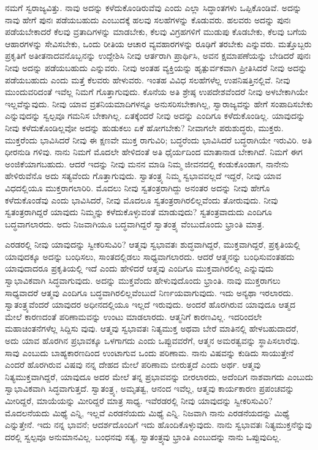 ನಮಗೆ ಸ್ವರಾಜ್ಯವಿತ್ತು. ನಾವು ಅದನ್ನು ಕಳೆದುಕೊಂಡಿರುವೆವು ಎಂದು ಎಲ್ಲಾ ಸಿದ್ಧಾಂತಗಳು ಒಪ್ಪಿಕೊಂಡಿವೆ. ಅದನ್ನು ನಾವು ಹೇಗೆ ಪುನಃ ಪಡೆಯಬಹುದು ಎಂಬುದಕ್ಕೆ ಹಲವು ಸಲಹೆಗಳನ್ನು ಕೊಡುವರು. ಹಲವರು ಅದನ್ನು ಪುನಃ ಪಡೆಯಬೇಕಾದರೆ ಕೆಲವು ವ್ರತಾದಿಗಳನ್ನು ಮಾಡಬೇಕು, ಕೆಲವು ವಿಗ್ರಹಗಳಿಗೆ ಮುಡುಪು ಕೊಡಬೇಕು, ಕೆಲವು ಬಗೆಯ ಆಹಾರಗಳನ್ನು ಸೇವಿಸಬೇಕು, ಒಂದು ರೀತಿಯ ಆಚಾರ ವ್ಯವಹಾರಗಳನ್ನು ರೂಢಿಗೆ ತರಬೇಕು ಎನ್ನುವರು. ಮತ್ತೊಬ್ಬರು ಪ್ರಕೃತಿಗೆ ಅತೀತನಾದವನೊಬ್ಬನನ್ನು ಉದ್ದೇಶಿಸಿ ನೀವು ಆರ್ತರಾಗಿ ಪ್ರಾರ್ಥಿಸಿ, ಅವನ ಕ್ಷಮಾಪಣೆಯನ್ನು ಬೇಡಿದರೆ ಪುನಃ ನೀವು ಅದನ್ನು ಪಡೆಯಬಹುದು ಎನ್ನುವರು. ನೀವು ಅಂತಹ ವ್ಯಕ್ತಿಯನ್ನು ಹೃತ್ಪುರ್ವಕವಾಗಿ ಪ್ರೀತಿಸಿದರೆ ನೀವು ಅದನ್ನು ಪಡೆಯಬಹುದು ಎಂದು ಮತ್ತೆ ಕೆಲವರು ಹೇಳುವರು. ಇಂತಹ ವಿವಿಧ ಸಲಹೆಗಳೆಲ್ಲ ಉಪನಿಷತ್ತಿನಲ್ಲಿವೆ. ನೀವು ಮುಂದುವರಿದಂತೆ ಇವೆಲ್ಲ ನಿಮಗೆ ಗೊತ್ತಾಗುವುದು. ಕೊನೆಯ ಅತಿ ಶ್ರೇಷ್ಠ ಉಪದೇಶವೆಂದರೆ ನೀವು ಅಳಬೇಕಾಗಿಯೇ ಇಲ್ಲವೆನ್ನುವುದು. ನೀವು ಯಾವ ವ್ರತನಿಯಮಾದಿಗಳನ್ನೂ ಅನುಸರಿಸಬೇಕಾಗಿಲ್ಲ, ಸ್ವಾರಾಜ್ಯವನ್ನು ಹೇಗೆ ಸಂಪಾದಿಸಬೇಕು ಎನ್ನುವುದನ್ನು ಸ್ವಲ್ಪವೂ ಗಮನಿಸ ಬೇಕಾಗಿಲ್ಲ. ಏತಕ್ಕೆಂದರೆ ನೀವು ಅದನ್ನು ಎಂದಿಗೂ ಕಳೆದುಕೊಂಡಿಲ್ಲ. ಯಾವುದನ್ನು ನೀವು ಕಳೆದುಕೊಂಡಿಲ್ಲವೋ ಅದನ್ನು ಹುಡುಕಲು ಏಕೆ ಹೋಗಬೇಕು? ನೀವಾಗಲೇ ಪರುಶುದ್ಧರು, ಮುಕ್ತರು. ಮುಕ್ತರೆಂದು ಭಾವಿಸಿದರೆ ನೀವು ಈ ಕ್ಷಣವೇ ಮುಕ್ತ ರಾಗುವಿರಿ; ಬದ್ಧರೆಂದು ಭಾವಿಸಿದರೆ ಬದ್ಧರಾಗಿಯೇ ಇರುವಿರಿ. ಅತಿ ಧೀರನುಡಿ ಗಳಿವು. ನಾನು ನಿಮಗೆ ಮೊದಲೇ ಹೇಳಿದಂತೆ ಅತಿ ಧೈರ್ಯದಿಂದ ಮಾತಾನಾಡ ಬೇಕಾಗಿದೆ. ನಿಮಗೆ ಈಗ ಅಂಜಿಕೆಯಾಗಬಹುದು. ಆದರೆ ಇದನ್ನು ನೀವು ಮನನ ಮಾಡಿ ನಿಮ್ಮ ಜೀವನದಲ್ಲಿ ಕಂಡುಕೊಂಡಾಗ, ನಾನೇನು ಹೇಳಿರುವೆನೊ ಅದು ಸತ್ಯವೆಂದು ಗೊತ್ತಾಗುವುದು. ಸ್ವಾತಂತ್ರ್ಯ ನಿಮ್ಮ ಸ್ವಭಾವವಲ್ಲದೆ ಇದ್ದರೆ, ನೀವು ಯಾವ ವಿಧದಲ್ಲಿಯೂ ಮುಕ್ತರಾಗಲಾರಿರಿ. ಮೊದಲು ನೀವು ಸ್ವತಂತ್ರರಾಗಿದ್ದು ಅನಂತರ ಅದನ್ನು ನೀವು ಹೇಗೊ ಕಳೆದುಕೊಂಡೆವು ಎಂದು ಭಾವಿಸಿದರೆ, ನೀವು ಮೊದಲೂ ಸ್ವತಂತ್ರರಾಗಿರಲಿಲ್ಲವೆಂದು ತೋರುವುದು. ನೀವು ಸ್ವತಂತ್ರರಾಗಿದ್ದರೆ ಯಾವುದು ನಿಮ್ಮನ್ನು ಕಳೆದುಕೊಳ್ಳುವಂತೆ ಮಾಡುವುದು? ಸ್ವತಂತ್ರವಾದುದು ಎಂದಿಗೂ ಬದ್ಧವಾಗಲಾರದು. ಅದು ನಿಜವಾಗಿಯೂ ಬದ್ಧವಾಗಿದ್ದರೆ ಸ್ವಾತಂತ್ರ್ಯ ವೆಂಬುದೊಂದು ಭ್ರಾಂತಿ ಮಾತ್ರ.

ಎರಡರಲ್ಲಿ ನೀವು ಯಾವುದನ್ನು ಸ್ವೀಕರಿಸುವಿರಿ? ಆತ್ಮವು ಸ್ವಭಾವತಃ ಶುದ್ಧವಾಗಿದ್ದರೆ, ಮುಕ್ತವಾಗಿದ್ದರೆ, ಪ್ರಕೃತಿಯಲ್ಲಿ ಯಾವುದಕ್ಕೂ ಅದನ್ನು ಬಂಧಿಸಲು, ಸಾಂತದಲ್ಲಿಡಲು ಸಾಧ್ಯವಾಗಲಾರದು. ಆದರೆ ಆತ್ಮನನ್ನು ಬಂಧಿಸುವಂತಹದು ಯಾವುದಾದರೂ ಪ್ರಕೃತಿಯಲ್ಲಿ ಇದೆ ಎಂದು ಹೇಳಿದರೆ ಆತ್ಮವು ಎಂದಿಗೂ ಮುಕ್ತವಾಗಿರಲಿಲ್ಲ ಎನ್ನುವುದು ಸ್ವಾಭಾವಿಕವಾಗಿ ಸಿದ್ಧವಾಗುವುದು. ಅದನ್ನು ಮುಕ್ತವೆಂದು ಹೇಳುವುದೊಂದು ಭ್ರಾಂತಿ. ನಾವು ಮುಕ್ತರಾಗಲು ಸಾಧ್ಯವಾದರೆ ಆತ್ಮವು ಎಂದಿಗೂ ಬದ್ಧವಾಗಿರಲಿಲ್ಲವೆಂಬುದೆ ನಿರ್ಣಯವಾಗುವುದು. ಇದು ಅನ್ಯಥಾ ಇರಲಾರದು. ಸ್ವಾತಂತ್ರ್ಯವೆಂದರೆ ಯಾವುದರ ಅಧೀನದಲ್ಲಿಯೂ ಇಲ್ಲದೆ ಇರುವುದು. ಅಂದರೆ ಹೊರಗಿರುವ ಯಾವುದೂ ಆತ್ಮದ ಮೇಲೆ ಕಾರಣದಂತೆ ಪರಿಣಾಮವನ್ನು ಉಂಟು ಮಾಡಲಾರದು. ಆತ್ಮನಿಗೆ ಕಾರಣವಿಲ್ಲ. ಇದರಿಂದಲೇ ಮಹಾಚಿಂತನೆಗಳೆಲ್ಲ ಸಿದ್ದಿಸು ವುವು. ಆತ್ಮವು ಸ್ವಭಾವತಃ ನಿತ್ಯಮುಕ್ತ ಅಥವಾ ಬೇರೆ ಮಾತಿನಲ್ಲಿ ಹೇಳಬಹುದಾದರೆ, ಅದು ಯಾವ ಹೊರಗಿನ ಪ್ರಭಾವಕ್ಕೂ ಒಳಗಾಗದು ಎಂದು ಒಪ್ಪುವವರೆಗೆ, ಆತ್ಮನ ಅಮರತ್ವವನ್ನು ಸ್ಥಾಪಿಸಲಾರೆವು. ಸಾವು ಎಂಬುದು ಬಾಹ್ಯಕಾರಣದಿಂದ ಉಂಟಾಗುವ ಒಂದು ಪರಿಣಾಮ. ನಾನು ವಿಷವನ್ನು ಕುಡಿದು ಸಾಯುತ್ತೇನೆ ಎಂದರೆ ಹೊರಗಿರುವ ವಿಷವು ನನ್ನ ದೇಹದ ಮೇಲೆ ಪರಿಣಾಮ ಬೀರುತ್ತದೆ ಎಂದು ಅರ್ಥ. ಆತ್ಮವು ನಿತ್ಯಮುಕ್ತವಾಗಿದ್ದರೆ, ಯಾವುದೂ ಅದರ ಮೇಲೆ ತನ್ನ ಪ್ರಭಾವವನ್ನು ಬೀರಲಾರದು, ಅದೆಂದಿಗ ನಾಶವಾಗದು ಎಂಬುದು ಸ್ವಾಭಾವಿಕವಾಗಿ ಸಿದ್ಧವಾಗುತ್ತದೆ. ಸ್ವಾತಂತ್ರ್ಯ, ಅಮೃತತ್ವ, ಆನಂದ ಇವೆಲ್ಲ, ಆತ್ಮವು ಕಾರ್ಯಕಾರಣ ಪ್ರಪಂಚವನ್ನು ಮೀರಿದ್ದರೆ, ಮಾಯೆಯನ್ನು ಮೀರಿದ್ದರೆ ಮಾತ್ರ ಸಾಧ್ಯ. ಇವೆರಡರಲ್ಲಿ ನೀವು ಯಾವುದನ್ನು ಸ್ವೀಕರಿಸುವಿರಿ? ಮೊದಲನೆಯದು ಮಿಥ್ಯೆ ಎನ್ನಿ, ಇಲ್ಲವೆ ಎರಡನೆಯದು ಮಿಥ್ಯೆ ಎನ್ನಿ. ನಿಜವಾಗಿ ನಾನು ಎರಡನೆಯದನ್ನು ಮಿಥ್ಯೆ ಎನ್ನುತ್ತೇನೆ. ಇದು ನನ್ನ ಭಾವನೆ; ಆದರ್ಶದೊಂದಿಗೆ ಇದು ಹೊಂದಿಕೊಳ್ಳುವುದು. ನಾನು ಸ್ವಭಾವತಃ ನಿತ್ಯಮುಕ್ತನೆನ್ನುವು ದರಲ್ಲಿ ಸ್ವಲ್ಪವೂ ಅನುಮಾನವಿಲ್ಲ. ಬಂಧನವು ಸತ್ಯ, ಸ್ವಾತಂತ್ರ್ಯವು ಭ್ರಾಂತಿ ಎಂಬುದನ್ನು ನಾನು ಒಪ್ಪುವುದಿಲ್ಲ.

